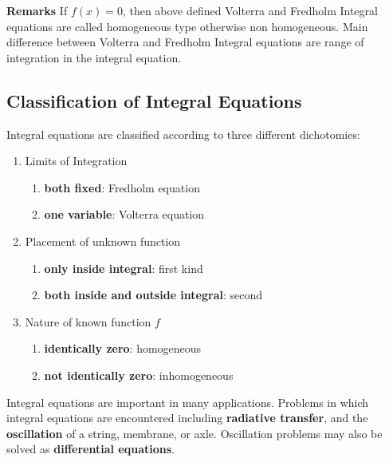 \documentclass[11pt]{report}
\newcommand{\bt}[1]{\textbf{#1}}
\newcommand{\NI}{\noindent}
\begin{document}
	\NI\bt{Remarks} If $f(x) = 0$, then above defined Volterra and Fredholm Integral equations are called homogeneous type otherwise non homogeneous. Main difference between Volterra and Fredholm Integral equations are range of integration in the integral equation.
	
	\subsection{Classification of Integral Equations}
	\par Integral equations are classified according to three different dichotomies:
	\begin{enumerate}
		\item Limits of Integration
			\begin{enumerate}
				\item \textbf{both fixed}: Fredholm equation
				\item  \textbf{one variable}: Volterra equation
			\end{enumerate}
		\item  Placement of unknown function
			\begin{enumerate}
				\item  \textbf{only inside integral}: first kind
				\item \textbf{both inside and outside integral}: second
			\end{enumerate}
		\item Nature of known function $f$
			\begin{enumerate}
				\item \textbf{identically zero}: homogeneous
				\item \textbf{not identically zero}: inhomogeneous
			\end{enumerate}
	\end{enumerate}

	\NI Integral equations are important in many applications. Problems in which integral equations are encountered including \textbf{radiative transfer}, and the \textbf{oscillation} of a string, membrane, or axle. Oscillation problems may also be solved as \textbf{differential equations}.
	
\end{document}
